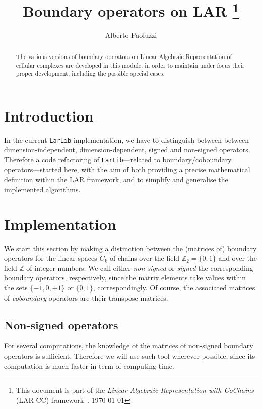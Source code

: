 \documentclass[11pt,oneside]{article}	%
\title{Boundary operators on LAR
\footnote{This document is part of the \emph{Linear Algebraic Representation with CoChains} (LAR-CC) framework~\cite{cclar-proj:2013:00}. \today}
}
\author{Alberto Paoluzzi}
\def\Z{\mathbb{Z}}
\begin{document}
\maketitle
\nonstopmode

\begin{abstract}
The various versions of boundary operators on Linear Algebraic Representation of cellular complexes are  developed in this module, in order to maintain under focus their proper development, including the possible special cases.
\end{abstract}

\tableofcontents
\newpage

\section{Introduction}

In the current \texttt{LarLib} implementation, we have to distinguish between between dimension-independent, dimension-dependent, signed and non-signed operators.
Therefore a code refactoring of \texttt{LarLib}---related to boundary/coboundary operators---started here, with the aim of both providing a precise mathematical definition within the LAR framework, and to simplify and generalise the implemented algorithms.


\section{Implementation}

We start this section by making a distinction between the (matrices of) boundary operators for the linear spaces $C_k$ of chains over the field $\Z_2 = \{0,1\}$ and over the field $\Z$ of integer numbers.
We call either \emph{non-signed} or \emph{signed} the corresponding boundary operators, respectively, since the matrix elements take values within the sets $\{-1,0,+1\}$ or $\{0,1\}$, correspondingly.
Of course, the associated matrices of \emph{coboundary} operators are their transpose matrices.


\subsection{Non-signed operators}

For several computations, the knowledge of the matrices of non-signed boundary operators is sufficient. 
Therefore we will use such tool wherever possible, since its computation is much faster in term of computing time. 
\end{document}
